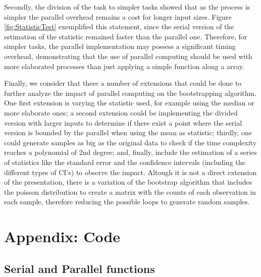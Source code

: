 \documentclass[11pt]{article}
\begin{document}
\medskip

Secondly, the division of the task to simpler tasks showed that as the process is simpler the parallel overhead remains a cost
for longer input sizes. Figure \ref{fig:StatisticTest} exemplified this statement, since the serial version of the estimation
of the statistic remained faster than the parallel one. Therefore, for simpler tasks, the parallel implementation may
possess a significant timing overhead, demonstrating that the use of parallel computing should be used with more elaborated
processes than just applying a simple function along a array.

\medskip

Finally, we consider that there a number of extensions that could be done to further analyze the impact of parallel computing
on the bootstrapping algorithm. One first extension is varying the statistic used, for example using the median or more elaborate ones;
a second extension could be implementing the divided version with larger inputs to determine if there exist a point where
the serial version is bounded by the parallel when using the mean as statistic; thirdly, one could generate samples as big
as the original data to check if the time complexity reaches a polynomial of 2nd degree; and, finally, include the estimation
of a series of statistics like the standard error and the confidence intervals (including the different types of CI's) to
observe the impact. Altough it is not a direct extension of the presentation, there is a variation of the bootstrap algorithm
that includes the poisson distribution to create a matrix with the counts of each observation in each sample, therefore reducing
the possible loops to generate random samples.




\printbibliography

\section{Appendix: Code}

\subsection{Serial and Parallel functions}
\end{document}
